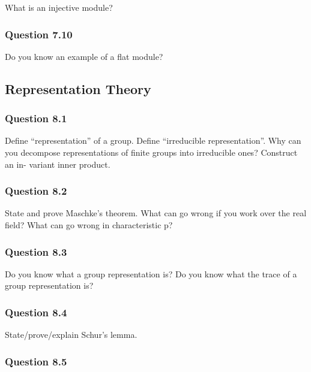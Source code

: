 What is an injective module?

\hypertarget{question-7.10}{%
\subsubsection{Question 7.10}\label{question-7.10}}

Do you know an example of a flat module?

\hypertarget{representation-theory}{%
\subsection{Representation Theory}\label{representation-theory}}

\hypertarget{question-8.1}{%
\subsubsection{Question 8.1}\label{question-8.1}}

Define ``representation'' of a group. Define ``irreducible
representation''. Why can you decompose representations of finite groups
into irreducible ones? Construct an in- variant inner product.

\hypertarget{question-8.2}{%
\subsubsection{Question 8.2}\label{question-8.2}}

State and prove Maschke's theorem. What can go wrong if you work over
the real field? What can go wrong in characteristic p?

\hypertarget{question-8.3}{%
\subsubsection{Question 8.3}\label{question-8.3}}

Do you know what a group representation is? Do you know what the trace
of a group representation is?

\hypertarget{question-8.4}{%
\subsubsection{Question 8.4}\label{question-8.4}}

State/prove/explain Schur's lemma.

\hypertarget{question-8.5}{%
\subsubsection{Question 8.5}\label{question-8.5}}

